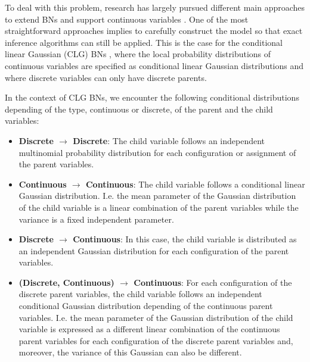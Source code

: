 To deal with this problem, research has largely pursued different main approaches to extend BNs and support continuous variables \cite{Lauritzen1992,lauritzen1996graphical,Jordan1999,LauritzenJensen2001,Moral2001}. One of the most straightforward approaches implies to carefully construct the model so that exact inference algorithms can still be applied. This is the case for the conditional linear Gaussian (CLG) BNs \cite{Lauritzen1992,lauritzen1996graphical}, where the local probability distributions of continuous variables are specified as conditional linear Gaussian distributions and where discrete variables can only have discrete parents. 

In the context of CLG BNs, we encounter the following conditional distributions depending of the type, continuous or discrete, of the parent and the child variables:

\begin{itemize}
\item \textbf{Discrete $\rightarrow$ Discrete}: The child variable follows an independent multinomial probability distribution for each configuration or assignment of the parent variables.

\item \textbf{Continuous $\rightarrow$ Continuous}: The child variable follows a conditional linear Gaussian distribution. I.e. the mean parameter of the Gaussian distribution of the child variable is a linear combination of the parent variables while the variance is a fixed independent parameter. 

\item \textbf{Discrete $\rightarrow$ Continuous}: In this case, the child variable is distributed as an independent Gaussian distribution for each configuration of the parent variables. 

\item \textbf{ (Discrete, Continuous) $\rightarrow$ Continuous}:  For each configuration of the discrete parent variables, the child variable follows an independent conditional Gaussian distribution depending of the continuous parent variables. I.e. the mean parameter of the Gaussian distribution of the child variable is expressed as a different linear combination of the continuous parent variables for each configuration of the discrete parent variables and, moreover, the variance of this Gaussian can also be different. 

\end{itemize}


